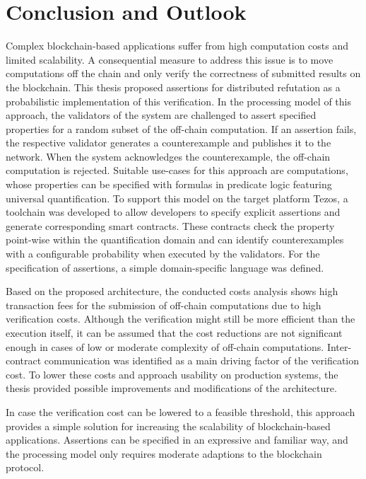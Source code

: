\chapter{Conclusion and Outlook}\label{chap:conclusion}
Complex blockchain-based applications suffer from high computation costs and limited scalability. A consequential measure to address this issue is to move computations off the chain and only verify the correctness of submitted results on the blockchain. This thesis  proposed assertions for distributed refutation as a probabilistic implementation of this verification. In the processing model of this approach, the validators of the system are challenged to assert specified properties for a random subset of the off-chain computation. If an assertion fails, the respective validator generates a counterexample and publishes it to the network. When the system acknowledges the counterexample, the off-chain computation is rejected. Suitable use-cases for this approach are computations, whose properties can be specified with formulas in predicate logic featuring universal quantification. To support this model on the target platform Tezos, a toolchain was developed to allow developers to specify explicit assertions and generate corresponding smart contracts. These contracts check the property point-wise within the quantification domain and can identify counterexamples with a configurable probability when executed by the validators. For the specification of assertions, a simple domain-specific language was defined.

Based on the proposed architecture, the conducted costs analysis shows high transaction fees for the submission of off-chain computations due to high verification costs. Although the verification might still be more efficient than the execution itself, it can be assumed that the cost reductions are not significant enough in cases of low or moderate complexity of off-chain computations. Inter-contract communication was identified as a main driving factor of the verification cost. To lower these costs and approach usability on production systems, the thesis provided possible improvements and modifications of the architecture.

In case the verification cost can be lowered to a feasible threshold, this approach provides a simple solution for increasing the scalability of blockchain-based applications. Assertions can be specified in an expressive and familiar way, and the processing model only requires moderate adaptions to the blockchain protocol.

